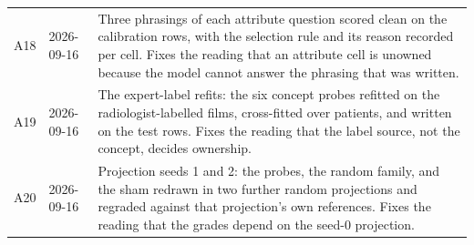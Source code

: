 \begin{table}[h]
\begin{tabular}{ll>{\raggedright\arraybackslash}p{}}
A18 & 2026-09-16 & Three phrasings of each attribute question scored clean on the calibration rows, with the selection rule and its reason recorded per cell. Fixes the reading that an attribute cell is unowned because the model cannot answer the phrasing that was written. \\
A19 & 2026-09-16 & The expert-label refits: the six concept probes refitted on the radiologist-labelled films, cross-fitted over patients, and written on the test rows. Fixes the reading that the label source, not the concept, decides ownership. \\
A20 & 2026-09-16 & Projection seeds 1 and 2: the probes, the random family, and the sham redrawn in two further random projections and regraded against that projection's own references. Fixes the reading that the grades depend on the seed-0 projection. \\
\bottomrule
\end{tabular}
\end{table}
